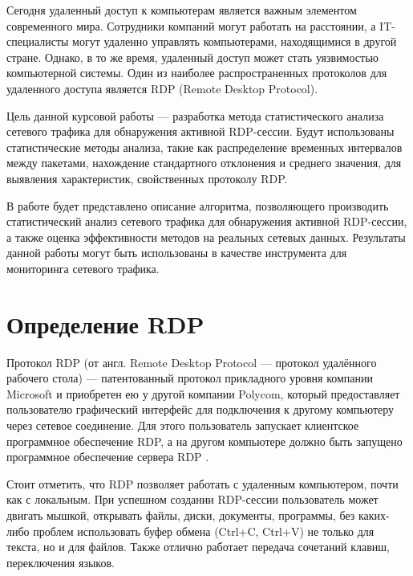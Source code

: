 \documentclass[bachelor, och, coursework]{SCWorks}
\begin{document}


\tableofcontents

\intro
Сегодня удаленный доступ к компьютерам является важным элементом современного мира. Сотрудники компаний могут работать на расстоянии, а 
IT-специалисты могут удаленно управлять компьютерами, находящимися в другой стране. Однако, в то же время, удаленный доступ может стать 
уязвимостью компьютерной системы. Один из наиболее распространенных протоколов для удаленного доступа является RDP (Remote Desktop Protocol). 

Цель данной курсовой работы --- разработка метода статистического анализа сетевого трафика для обнаружения активной RDP-сессии. 
Будут использованы статистические методы анализа, такие как распределение временных интервалов между пакетами, нахождение стандартного отклонения и 
среднего значения, для выявления характеристик, свойственных протоколу RDP.

В работе будет представлено описание алгоритма, позволяющего производить статистический анализ сетевого трафика для обнаружения активной 
RDP-сессии, а также оценка эффективности методов на реальных сетевых данных. 
Результаты данной работы могут быть использованы в качестве инструмента для мониторинга сетевого трафика.


\section{Определение RDP}

  Протокол RDP (от англ. Remote Desktop Protocol --- протокол удалённого рабочего стола) --- патентованный протокол 
  прикладного уровня компании Microsoft и приобретен ею у другой компании Polycom, который предоставляет пользователю графический интерфейс для 
  подключения к другому компьютеру через сетевое соединение. Для этого пользователь запускает клиентское программное обеспечение RDP, а на другом 
  компьютере должно быть запущено программное обеспечение сервера RDP \cite{2}.

  Стоит отметить, что RDP позволяет работать с удаленным компьютером, почти как с локальным. При успешном создании RDP-сессии пользователь может
  двигать мышкой, открывать файлы, диски, документы, программы, без каких-либо проблем использовать буфер обмена (Ctrl+C, Ctrl+V) не только для текста, 
  но и для файлов. Также отлично работает передача сочетаний клавиш, переключения языков.
\end{document}
